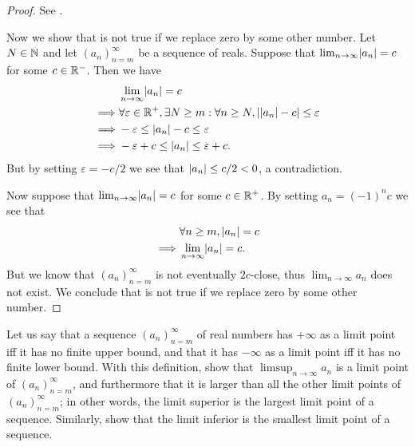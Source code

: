\begin{proof}
  See .

  Now we show that  is not true if we replace zero by some other number.
  Let \(N \in \mathbb{N}\) and let \((a_n)_{n = m}^\infty\) be a sequence of reals.
  Suppose that \(\lim_{n \to \infty} \abs{a_n} = c\) for some \(c \in \mathbb{R}^-\).
  Then we have
  \begin{align*}
             & \lim_{n \to \infty} \abs{a_n} = c                                                                       \\
    \implies & \forall \varepsilon \in \R^+, \exists N \geq m : \forall n \geq N, \abs{\abs{a_n} - c} \leq \varepsilon \\
    \implies & -\varepsilon \leq \abs{a_n} - c \leq \varepsilon                                                        \\
    \implies & -\varepsilon + c \leq \abs{a_n} \leq \varepsilon + c.
  \end{align*}
  But by setting \(\varepsilon = -c / 2\) we see that \(\left\lvert a_n\right\rvert \leq c / 2 < 0\), a contradiction.

  Now suppose that \(\lim_{n \to \infty} \abs{a_n} = c\) for some \(c \in \mathbb{R}^+\).
  By setting \(a_n = (-1)^n c\) we see that
  \begin{align*}
             & \forall n \geq m, \abs{a_n} = c    \\
    \implies & \lim_{n \to \infty} \abs{a_n} = c.
  \end{align*}
  But we know that \((a_n)_{n = m}^\infty\) is not eventually \(2c\)-close, thus \(\lim_{n \to \infty} a_n\) does not exist.
  We conclude that  is not true if we replace zero by some other number.
\end{proof}

\begin{ex}\label{i:ex:6.4.8}
  Let us say that a sequence \((a_n)_{n = m}^\infty\) of real numbers has \(+\infty\) as a limit point iff it has no finite upper bound, and that it has \(-\infty\) as a limit point iff it has no finite lower bound.
  With this definition, show that \(\limsup_{n \to \infty} a_n\) is a limit point of \((a_n)_{n = m}^\infty\), and furthermore that it is larger than all the other limit points of \((a_n)_{n = m}^\infty\);
  in other words, the limit superior is the largest limit point of a sequence.
  Similarly, show that the limit inferior is the smallest limit point of a sequence.
\end{ex}

